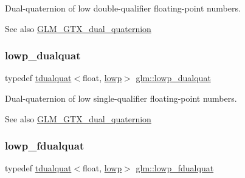 Dual-\/quaternion of low double-\/qualifier floating-\/point numbers.

\begin{DoxySeeAlso}{See also}
\hyperlink{group__gtx__dual__quaternion}{G\+L\+M\+\_\+\+G\+T\+X\+\_\+dual\+\_\+quaternion} 
\end{DoxySeeAlso}
\mbox{\label{group__gtx__dual__quaternion_ga4888200ed911e4887c2423fed74ad362}} 
\subsubsection{\texorpdfstring{lowp\+\_\+dualquat}{lowp\_dualquat}}
{\footnotesize\ttfamily typedef \hyperlink{structglm_1_1tdualquat}{tdualquat}$<$float, \hyperlink{namespaceglm_a36ed105b07c7746804d7fdc7cc90ff25ae161af3fc695e696ce3bf69f7332bc2d}{lowp}$>$ \hyperlink{group__gtx__dual__quaternion_ga4888200ed911e4887c2423fed74ad362}{glm\+::lowp\+\_\+dualquat}}

Dual-\/quaternion of low single-\/qualifier floating-\/point numbers.

\begin{DoxySeeAlso}{See also}
\hyperlink{group__gtx__dual__quaternion}{G\+L\+M\+\_\+\+G\+T\+X\+\_\+dual\+\_\+quaternion} 
\end{DoxySeeAlso}
\mbox{\label{group__gtx__dual__quaternion_ga797f6d2679ab6773c1f057b97bf95111}} 
\subsubsection{\texorpdfstring{lowp\+\_\+fdualquat}{lowp\_fdualquat}}
{\footnotesize\ttfamily typedef \hyperlink{structglm_1_1tdualquat}{tdualquat}$<$float, \hyperlink{namespaceglm_a36ed105b07c7746804d7fdc7cc90ff25ae161af3fc695e696ce3bf69f7332bc2d}{lowp}$>$ \hyperlink{group__gtx__dual__quaternion_ga797f6d2679ab6773c1f057b97bf95111}{glm\+::lowp\+\_\+fdualquat}}

